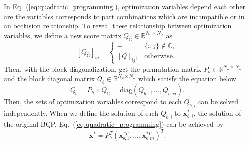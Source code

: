 \documentclass[runningheads]{llncs}
\begin{document}
In Eq.~(\ref{eq:quadratic_programming}), optimization variables depend each other are the variables corresponds to part combinations which are incompatible or in an occlusion relationship.
To reveal these relationship between optimization variables, we define a new score matrix $Q_{\bar{\mathbb{C}}} \in \mathbb{R}^{N_{\omega} \times N_{\omega}}$ as
\begin{equation}
   \label{eq:Q_incompatible}
   [Q_{\bar{\mathbb{C}}}]_{ij} = 
   \begin{cases}
      -1        & \{i,j\} \notin \mathbb{C}, \\
      [Q]_{ij}, & \mathrm{otherwise}.
   \end{cases}
\end{equation}
Then, with the block diagonalization, get the permutation matrix $P_b \in \mathbb{R}^{N_{\omega} \times N_{\omega}}$ and the block diagonal matrix $Q_b \in \mathbb{R}^{N_{\omega} \times N_{\omega}}$ which satisfy the equation below
\begin{equation}
   \label{eq:Q_bd}
   Q_b = P_b \times Q_{\bar{\mathbb{C}}} = \mathrm{diag}(Q_{b,1},...,Q_{b,m}).
\end{equation}
Then, the sets of optimization variables correspond to each $Q_{b,i}$ can be solved independently.
When we define the solution of each $Q_{b,i}$ to $\mathbf{x}_{b,i}^*$, the solution of the original BQP, Eq.~(\ref{eq:quadratic_programming}) can be achieved by
\begin{equation}
   \label{eq:solution_merge}
   \mathbf{x}^* = P_b^T (\mathbf{x}_{b,1}^{*T}, ..., \mathbf{x}_{b,m}^{*T})^T.
\end{equation}
\end{document}

